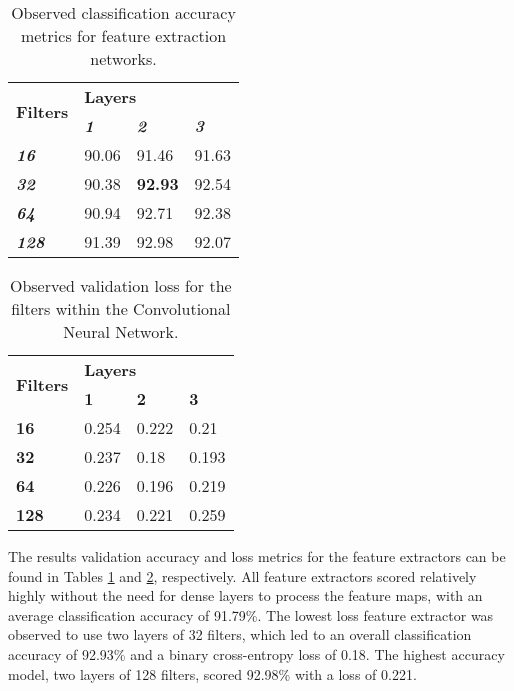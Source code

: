 \documentclass{article}
\begin{document}
\begin{table}[] \footnotesize
\centering
\caption{Observed classification accuracy metrics for feature extraction networks. }
\label{tab:cnn-acc}
\begin{tabular}{@{}llll@{}}
\toprule
\multirow{2}{*}{\textbf{Filters}} & \multicolumn{3}{l}{\textbf{Layers}}                             \\ \cmidrule(l){2-4} 
                                  & \textit{\textbf{1}} & \textit{\textbf{2}} & \textit{\textbf{3}} \\ \cmidrule(r){1-1}
\textit{\textbf{16}}              & 90.06               & 91.46               & 91.63               \\
\textit{\textbf{32}}              & 90.38               & \textbf{92.93}      & 92.54               \\
\textit{\textbf{64}}              & 90.94               & 92.71               & 92.38               \\
\textit{\textbf{128}}             & 91.39               & 92.98               & 92.07               \\ \bottomrule
\end{tabular}
\end{table}

\begin{table}[] \footnotesize
\centering
\caption{Observed validation loss for the filters within the Convolutional Neural Network.}
\label{tab:cnn-loss}
\begin{tabular}{@{}llll@{}}
\toprule
\multirow{2}{*}{\textbf{Filters}} & \multicolumn{3}{l}{\textbf{Layers}}  \\ \cmidrule(l){2-4} 
                                  & \textbf{1} & \textbf{2} & \textbf{3} \\ \cmidrule(r){1-1}
\textbf{16}                       & 0.254      & 0.222      & 0.21       \\
\textbf{32}                       & 0.237      & 0.18       & 0.193      \\
\textbf{64}                       & 0.226      & 0.196      & 0.219      \\
\textbf{128}                      & 0.234      & 0.221      & 0.259     
         \\ \bottomrule
\end{tabular}
\end{table}

The results validation accuracy and loss metrics for the feature extractors can be found in Tables \ref{tab:cnn-acc} and \ref{tab:cnn-loss}, respectively. All feature extractors scored relatively highly without the need for dense layers to process the feature maps, with an average classification accuracy of 91.79\%. The lowest loss feature extractor was observed to use two layers of 32 filters, which led to an overall classification accuracy of 92.93\% and a binary cross-entropy loss of 0.18. The highest accuracy model, two layers of 128 filters, scored 92.98\% with a loss of 0.221. 
\end{document}
